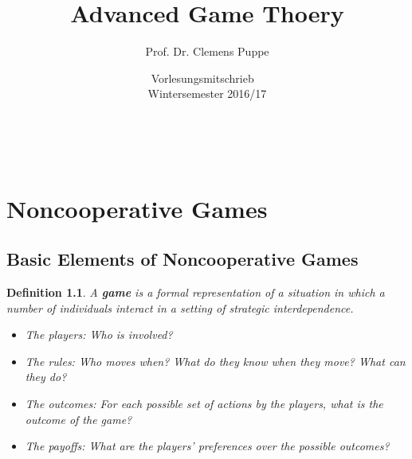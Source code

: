 \documentclass[12pt]{extreport} %
\title{Advanced Game Thoery}
\author{Prof. Dr. Clemens Puppe}
\date{Vorlesungsmitschrieb ~\vspace{0.2cm} \\ Wintersemester 2016/17}
\makeatletter
\theoremstyle{named}
\theoremstyle{itshape}
\newtheorem*{definition}{Definition}
\theoremstyle{normal}
\def\maketitle{ \begin{titlepage} 
			~\vspace{3cm} 
		\begin{center} {\Huge \@title} \end{center} 
	 		\vspace*{1cm} 
	 	\begin{center} {\large \@author} \end{center} 
	 	\begin{center} \@date \end{center} 
	 		\vspace*{7cm} 
	 	\begin{center} \@publishers \end{center} 
	 		\vfill 
	\end{titlepage} }
\makeatother
\begin{document}
\begin{titlepage}
	\maketitle
	\thispagestyle{empty}
\end{titlepage}
	
\tableofcontents
\thispagestyle{empty} 
  
\chapter{Noncooperative Games}

\section{Basic Elements of Noncooperative Games}


\begin{definition}
	A \textbf{game} is a formal representation of a situation in which a number of individuals interact in a setting of strategic interdependence.
	
	\begin{itemize}
		\item The players: Who is involved?
		\item The rules: Who moves when? What do they know when they move? What can they do?
		\item The outcomes: For each possible set of actions by the players, what is the outcome of the game?
		\item The payoffs: What are the players' preferences over the possible outcomes?
	\end{itemize} 
\end{definition} ~\newpage
\end{document}
